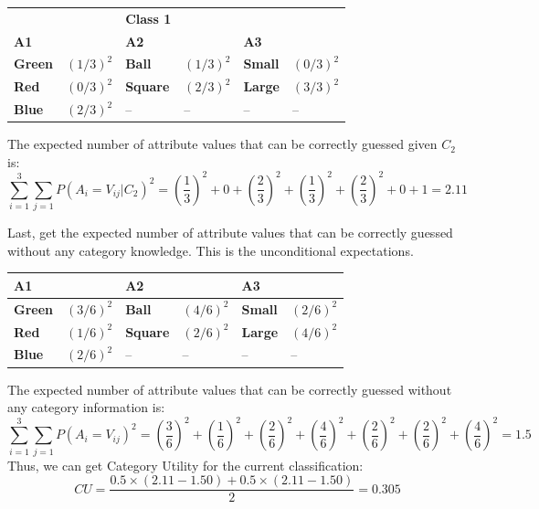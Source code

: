   \begin{table}[!ht]
   \ttabbox{\caption{}}
   {
   \centering
   \begin{tabular}{l l l l l l}\hline
   \textbf{ } & \textbf{ } & \textbf{Class 1 } & \textbf{} & \textbf{ } & \textbf{ } \\
   \textbf{A1} & \textbf{ } & \textbf{A2} & \textbf{ } & \textbf{A3} & \textbf{ } \\\hline
   \textbf{Green} & $({1}/{3})^2$ & \textbf{Ball} & $({1}/{3})^2$ & \textbf{Small} & $({0}/{3})^2$ \\
   \textbf{Red} & $({0}/{3})^2$ & \textbf{Square} & $(2/3)^2$ & \textbf{Large} & $({3}/{3})^2$ \\
   \textbf{Blue} & $(2/3)^2$ & -- & -- & -- & -- \\\hline
   \end{tabular}
   \label{tab:solexperiment31}}
   \end{table}
The expected number of attribute values that can be correctly guessed given $C_2$ is: $$\sum_{i=1}^{3} \sum_{j=1}^{}P(A_i=V_{ij}\left|C_2\right.)^2=(\frac{1}{3})^2+0+(\frac{2}{3})^2+(\frac{1}{3})^2+(\frac{2}{3})^2+0+1=2.11$$

Last, get the expected number of attribute values that can be correctly guessed without any category knowledge. This is the unconditional expectations.
 \begin{table}[!ht]
   \ttabbox{\caption{}}
   {
   \centering
   \begin{tabular}{l l l l l l}\hline
   \textbf{A1} & \textbf{ } & \textbf{A2} & \textbf{ } & \textbf{A3} & \textbf{ } \\\hline
   \textbf{Green} & $({3}/{6})^2$ & \textbf{Ball} & $({4}/{6})^2$ & \textbf{Small} & $(2/6)^2$ \\
   \textbf{Red} & $(1/6)^2$ & \textbf{Square} & $(2/6)^2$ & \textbf{Large} & $(4/6)^2$ \\
   \textbf{Blue} & $(2/6)^2$ & -- & -- & -- & -- \\\hline
   \end{tabular}
   \label{tab:solexperiment32}}
   \end{table}
   
The expected number of attribute values that can be correctly guessed without any category information is: $$\sum_{i=1}^{3} \sum_{j=1}^{}P(A_i=V_{ij})^2=(\frac{3}{6})^2+(\frac{1}{6})^2+(\frac{2}{6})^2+(\frac{4}{6})^2+(\frac{2}{6})^2+(\frac{2}{6})^2+(\frac{4}{6})^2=1.5$$
Thus, we can get Category Utility for the current classification: $$CU=\frac{0.5\times(2.11-1.50)+0.5\times(2.11-1.50)}{2}=0.305$$

